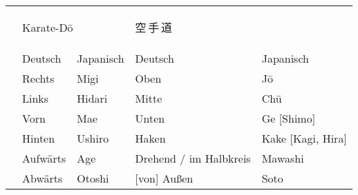 \begin{tabularx}{\textwidth}{lllll}
		& \multicolumn{2}{l}{Karate-D\={o}}			& {\LARGE \begin{CJK*}{UTF8}{ipxm}空\,手\,道\end{CJK*}}        & \\
		\addlinespace
		\addlinespace
		& Deutsch 	& Japanisch 	& Deutsch 								& Japanisch\\
		\midrule
		& Rechts 			& Migi 					& Oben 												& J\={o} \\
		& Links				& Hidari 				& Mitte 											& Ch\={u} \\
		& Vorn 				& Mae 					& Unten 											& Ge [Shimo] \\
		& Hinten 			& Ushiro 				& Haken 											& Kake [Kagi, Hira] \\
		& Aufwärts 			& Age 					& Drehend / im Halbkreis 							& Mawashi\\
		& Abwärts 			& Otoshi 				& [von] Außen 										& Soto \\
	\end{tabularx}	
	\null\vfill\null